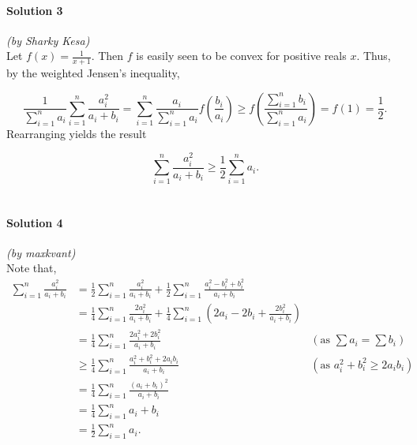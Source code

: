 \documentclass[10pt]{article}
\begin{document}
	 \paragraph{Solution 3} \textit{(by Sharky Kesa)}\\
	
	\noindent Let $f(x) = \frac{1}{x+1}$. Then $f$ is easily seen to be convex for positive reals $x$. Thus, by the weighted Jensen's inequality,
	
	\[\frac{1}{\sum \limits_{i=1}^n a_i} \sum \limits_{i=1}^n \frac{a_i^2}{a_i + b_i} = \sum \limits_{i=1}^n \frac{a_i}{\sum \limits_{i=1}^n a_i} f \left ( \frac{b_i}{a_i} \right ) \geq f \left ( \frac{\sum \limits_{i=1}^n b_i}{\sum \limits_{i=1}^n a_i} \right ) = f(1) = \frac{1}{2}.\]
	Rearranging yields the result
	
	\[\sum_{i=1}^n \frac{a_i^2}{a_i+b_i} \geq \frac 12 \sum_{i=1}^n a_i.\tag*{\(\square\)}\]\\[-13pt]
	
	\noindent \makebox[\linewidth]{\rule{\textwidth}{0.4pt}}
	
	\paragraph{Solution 4} \textit{(by maxkvant)}\\
	
	\noindent Note that,
	\begin{align*}
	\sum_{i=1}^n \frac{a_i^2}{a_i + b_i} &= \frac 12 \sum_{i=1}^n \frac{a_i^2}{a_i + b_i} + \frac 12 \sum_{i=1}^n \frac{a_i^2 - b_i^2 + b_i^2}{a_i + b_i}\\
	&= \frac 14 \sum_{i=1}^n \frac{2a_i^2}{a_i + b_i} + \frac 14 \sum_{i=1}^n \left( 2a_i - 2b_i + \frac{2b_i^2}{a_i + b_i} \right)\\
	&= \frac 14 \sum_{i=1}^n \frac{2a_i^2 + 2b_i^2}{a_i + b_i}&\left(\text{as }\sum a_i = \sum b_i \right)\\
	&\geq \frac 14 \sum_{i=1}^n \frac{a_i^2 + b_i^2 + 2a_ib_i}{a_i + b_i} &\left(\text{as } a_i^2+b_i^2 \geq 2a_ib_i \right)\\
	&= \frac 14 \sum_{i=1}^n \frac{(a_i + b_i)^2}{a_i + b_i}\\
	&= \frac 14 \sum_{i=1}^n a_i + b_i\\
	&= \frac 12 \sum_{i=1}^n a_i. \tag*{\(\square\)}
	\end{align*}
	
\end{document}
